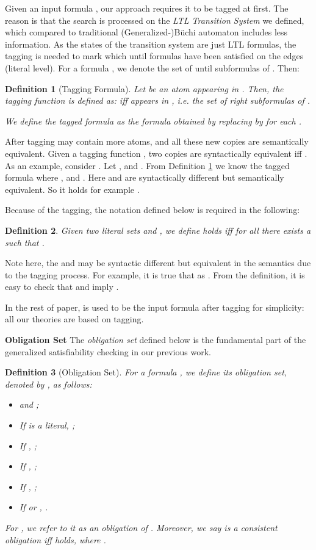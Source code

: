 \documentclass[conference]{IEEEtran}
\newtheorem{definition}{Definition}
\begin{document}
Given an input formula , our approach requires it to be tagged at first. 
The reason is that the search is processed on the \textit{LTL Transition System} we defined, 
which compared to traditional (Generalized-)B\"uchi automaton includes less information. 
As the states of the transition system are just LTL formulas, the tagging is needed to mark 
which until formulas have been satisfied on the edges (literal level). For a formula ,
we denote  the set of until
subformulas of . Then:
\begin{definition}[Tagging Formula]\label{def:tagging}
  Let  be an atom appearing in .  Then, the tagging
  function  is defined as:
   iff  appears in , i.e. the set of right subformulas of .

  We define the \emph{tagged formula}  as the formula obtained
  by replacing  by  for each . 
\end{definition}

After tagging  may contain more atoms, and 
all these new copies are semantically equivalent. Given a tagging
function , two copies  are syntactically equivalent iff
.
As an example, consider . Let
, and .  From Definition
\ref{def:tagging} we know the tagged formula  
where , and
. 
Here  and  are syntactically different but semantically equivalent.
So it holds for example . 

Because of the tagging, the  
notation defined below is required in the following:


\begin{definition}\label{def:subseteqw}
  Given two literal sets  and , we define  holds iff for all 
   there exists a  such that .
\end{definition}
Note here, the  and  may be syntactic different but equivalent 
in the semantics due to the tagging process. For example, it is true that 
 as . From the definition, it is easy to check 
that  and  imply 
.


In the rest of paper,  is used to be the input formula after tagging for simplicity: all our theories are based on tagging. 

\fi

\noindent
\textbf{Obligation Set} The \textit{obligation set} defined below is the fundamental part of the generalized satisfiability checking in our previous work. 


\begin{definition}[Obligation Set]\label{def:os}
  For a formula , we define its obligation set, denoted by
  , as follows:
  \begin{itemize}
  \item  and ;
   \item If  is a literal, ;
    \item If , ;
    \item If , ;
    \item If , ;
    \item If  or , .
 \end{itemize}
 For , we refer to it as an \emph{obligation} of
 . Moreover, we say  is a consistent obligation iff  holds, 
 where .
\end{definition}
\end{document}
